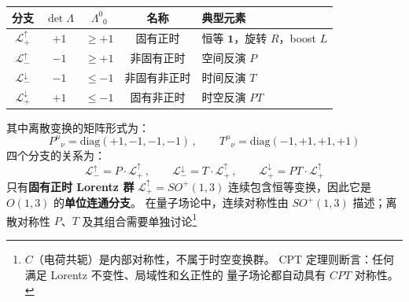 \begin{itemize}
            \begin{center}
            \renewcommand{\arraystretch}{1.5}
            \begin{tabular}{ccccl}
              \hline
              分支 & $\det\Lambda$ & $\Lambda^0{}_0$ & 名称 & 典型元素 \\
              \hline
              $\mathcal{L}^\uparrow_+$ & $+1$ & $\geqslant+1$
                & 固有正时 & 恒等 $\mathbf{1}$，旋转 $R$，boost $L$ \\
              $\mathcal{L}^\uparrow_-$ & $-1$ & $\geqslant+1$
                & 非固有正时 & 空间反演 $P$ \\
              $\mathcal{L}^\downarrow_-$ & $-1$ & $\leqslant-1$
                & 非固有非正时 & 时间反演 $T$ \\
              $\mathcal{L}^\downarrow_+$ & $+1$ & $\leqslant-1$
                & 固有非正时 & 时空反演 $PT$ \\
              \hline
            \end{tabular}
            \end{center}
            \noindent 其中离散变换的矩阵形式为：
            \begin{equation}\label{eq:P-T-matrices}
              P^\mu{}_\nu = \mathrm{diag}(+1,-1,-1,-1)\,,\qquad
              T^\mu{}_\nu = \mathrm{diag}(-1,+1,+1,+1)
            \end{equation}
            四个分支的关系为：
            \[
              \mathcal{L}^\uparrow_- = P\cdot\mathcal{L}^\uparrow_+\,,\qquad
              \mathcal{L}^\downarrow_- = T\cdot\mathcal{L}^\uparrow_+\,,\qquad
              \mathcal{L}^\downarrow_+ = PT\cdot\mathcal{L}^\uparrow_+
            \]
            只有\textbf{固有正时 Lorentz 群} $\mathcal{L}^\uparrow_+ = SO^+(1,3)$
            连续包含恒等变换，因此它是 $O(1,3)$ 的\textbf{单位连通分支}。
            在量子场论中，连续对称性由 $SO^+(1,3)$ 描述；离散对称性 $P$、$T$
            及其组合需要单独讨论\footnote{$C$（电荷共轭）是内部对称性，不属于时空变换群。
            CPT 定理则断言：任何满足 Lorentz 不变性、局域性和幺正性的
            量子场论都自动具有 $CPT$ 对称性。}
\end{itemize}
\vspace{3ex}

